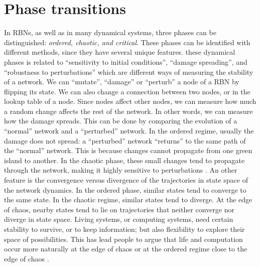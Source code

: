 \section{Phase transitions}
In RBNs, as well as in many dynamical systems, three
phases can be distinguished: \emph{ordered, chaotic, and critical}.
These phases can be identified with different methods, since
they have several unique features.
these dynamical phases is related to
“sensitivity to initial conditions”, “damage spreading”, and
“robustness to perturbations” which are different ways of
measuring the stability of a network. We can “mutate”,
“damage” or “perturb” a node of a RBN by flipping its state.
We can also change a connection between two nodes, or in
the lookup table of a node. Since nodes affect other nodes,
we can measure how much a random change affects the rest
of the network. In other words, we can measure how the
damage spreads. This can be done by comparing the evolution of a “normal” network and a “perturbed” network. In
the ordered regime, usually the damage does not spread: a
“perturbed” network “returns” to the same path of the “normal” network. This is because changes cannot propagate
from one green island to another. In the chaotic phase, these
small changes tend to propagate through the network, making it highly sensitive to perturbations \cite{K49}.
An other feature is the convergence versus divergence of the
trajectories in state space of the network dynamics. In the ordered phase, similar states tend to converge to the same state.
In the chaotic regime, similar states tend to diverge. At the
edge of chaos, nearby states tend to lie on trajectories that
neither converge nor diverge in state space.
Living systems, or computing systems, need certain stability to survive, or to keep information; but also flexibility
to explore their space of possibilities. This has lead people
to argue that life and computation occur more naturally at
the edge of chaos or at the ordered regime
close to the edge of chaos \cite{K49}.
